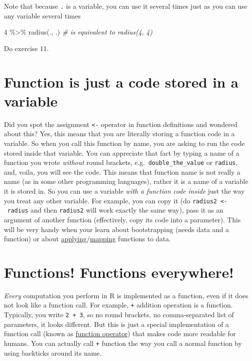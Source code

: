 \documentclass[
]{book}
\newenvironment{Shaded}{\begin{snugshade}}{\end{snugshade}}
\newcommand{\CommentTok}[1]{\textcolor[rgb]{0.56,0.35,0.01}{\textit{#1}}}
\newcommand{\DecValTok}[1]{\textcolor[rgb]{0.00,0.00,0.81}{#1}}
\newcommand{\FunctionTok}[1]{\textcolor[rgb]{0.00,0.00,0.00}{#1}}
\newcommand{\NormalTok}[1]{#1}
\newcommand{\SpecialCharTok}[1]{\textcolor[rgb]{0.00,0.00,0.00}{#1}}
\begin{document}
Note that because \texttt{.} is a variable, you can use it several times just as you can use any variable several times

\begin{Shaded}
\begin{Highlighting}[]
\DecValTok{4} \SpecialCharTok{\%\textgreater{}\%} \FunctionTok{radius}\NormalTok{(., .) }\CommentTok{\# is equivalent to radius(4, 4)}
\end{Highlighting}
\end{Shaded}

Do exercise 11.

\hypertarget{function-is-just-a-code-stored-in-a-variable}{%
\section{Function is just a code stored in a variable}\label{function-is-just-a-code-stored-in-a-variable}}

Did you spot the assignment \texttt{\textless{}-} operator in function definitions and wondered about this? Yes, this means that you are literally storing a function code in a variable. So when you call this function by name, you are asking to run the code stored inside that variable. You can appreciate that fact by typing a name of a function you wrote \emph{without} round brackets, e.g.~\texttt{double\_the\_value} or \texttt{radius}, and, voila, you will see the code. This means that function name is not really a name (as in some other programming languages), rather it is a name of a variable it is stored in. So you can use a variable \emph{with a function code inside} just the way you treat any other variable. For example, you can copy it (do \texttt{radius2\ \textless{}-\ radius} and then \texttt{radius2} will work exactly the same way), pass it as an argument of another function (effectively, copy its code into a parameter). This will be very handy when your learn about bootstrapping (needs data and a function) or about \href{https://stat.ethz.ch/R-manual/R-devel/library/base/html/apply.html}{applying}/\href{https://purrr.tidyverse.org/}{mapping} functions to data.

\hypertarget{functions-functions-everywhere}{%
\section{Functions! Functions everywhere!}\label{functions-functions-everywhere}}

\emph{Every} computation you perform in R is implemented as a function, even if it does not look like a function call. For example, \texttt{+} addition operation is a function. Typically, you write \texttt{2\ +\ 3}, so no round brackets, no comma-separated list of parameters, it looks different. But this is just a special implementation of a function call (known as \href{http://adv-r.had.co.nz/Function-operators.html}{function operator}) that makes code more readable for humans. You can actually call \texttt{+} function the way you call a normal function by using backticks around its name.
\end{document}
